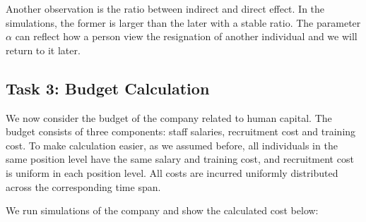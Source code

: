 \documentclass[tcn = 37075, sheet = false, abstract = false]{mcmthesis}
\begin{document}
Another observation is the ratio between indirect and direct effect. In the simulations, the former is larger than the later with a stable ratio. The parameter $\alpha$ can reflect how a person view the resignation of another individual and we will return to it later.

\subsection{Task 3: Budget Calculation}

We now consider the budget of the company related to human capital. The budget consists of three components: staff salaries, recruitment cost and training cost. To make calculation easier, as we assumed before, all individuals in the same position level have the same salary and training cost, and recruitment cost is uniform in each position level. All costs are incurred uniformly distributed across the corresponding time span.

We run simulations of the company and show the calculated cost below:
\end{document}
